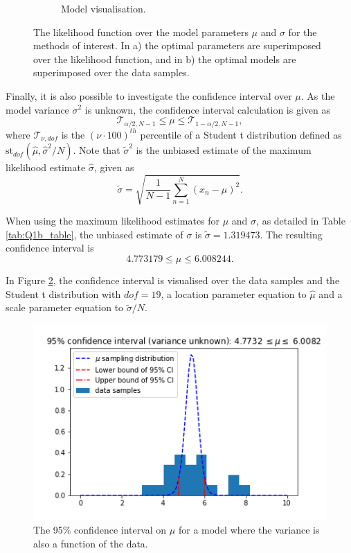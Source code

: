 \documentclass{article}
\begin{document}
\begin{figure}[!htb]
\begin{subfigure}[b]{0.45\textwidth}
         \caption{Model visualisation.}
     \end{subfigure}
        \caption{The likelihood function over the model parameters $\mu$ and $\sigma$ for the methods of interest. In a) the optimal parameters are superimposed over the likelihood function, and in b) the optimal models are superimposed over the data samples.}
        \label{fig:Q1b_2}
\end{figure}

Finally, it is also possible to investigate the confidence interval over $\mu$. As the model variance $\sigma^2$ is unknown, the confidence interval calculation is given as
\begin{equation}
    \mathcal{T}_{\alpha/2, N-1} \leq \mu \leq \mathcal{T}_{1-\alpha/2, N-1},
\end{equation}
where $\mathcal{T}_{\nu, dof}$ is the $(\nu\cdot 100)^{th}$ percentile of a Student t distribution defined as $\text{st}_{dof}\left(\hat{\mu}, \hat{\sigma}^2/N \right)$. Note that $\tilde{\sigma}^2$ is the unbiased estimate of the maximum likelihood estimate $\hat{\sigma}$, given as 
\begin{equation}
    \tilde{\sigma} = \sqrt{\frac{1}{N-1} \sum_{n=1}^{N} \left(x_n - \mu\right)^2}.
\end{equation}

When using the maximum likelihood estimates for $\mu$ and $\sigma$, as detailed in Table \ref{tab:Q1b_table}, the unbiased estimate of $\sigma$ is $\tilde{\sigma} = 1.319473$. The resulting confidence interval is
\begin{equation}
    4.773179 \leq \mu \leq 6.008244.
\end{equation}

In Figure \ref{fig:Q1b_3}, the confidence interval is visualised over the data samples and the Student t distribution with $dof=19$, a location parameter equation to $\hat{\mu}$ and a scale parameter equation to $\tilde{\sigma}/N$. 
 \begin{figure}
     \centering
     \includegraphics[scale=0.6]{Q1b_fig4.png}
     \caption{The 95$\%$ confidence interval on $\mu$ for a model where the variance is also a function of the data.}
     \label{fig:Q1b_3}
 \end{figure}
 
\end{document}
